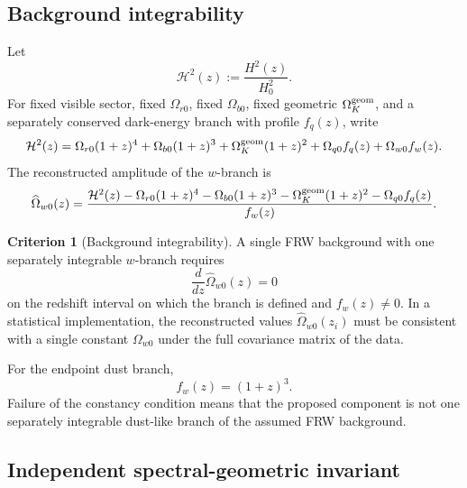 \documentclass[11pt,a4paper]{article}
\def\dd{d}%
\numberwithin{equation}{section}
\theoremstyle{definition}
\newtheorem{criterion}{Criterion}
\theoremstyle{plain}
\theoremstyle{remark}
\newcommand{\dd}{\mathrm{d}}
\begin{document}
\subsection{Background integrability}

Let
\begin{equation}
\mathcal H^2(z):=\frac{H^2(z)}{H_0^2}.
\end{equation}
For fixed visible sector, fixed \(\Omega_{r0}\), fixed \(\Omega_{b0}\), fixed geometric \(\Omega_K^{\rm geom}\), and a separately conserved dark-energy branch with profile \(f_q(z)\), write
\begin{equation}
\mathcal H^2(z)=
\Omega_{r0}(1+z)^4
+\Omega_{b0}(1+z)^3
+\Omega_K^{\rm geom}(1+z)^2
+\Omega_{q0}f_q(z)
+\Omega_{w0}f_w(z).
\end{equation}
The reconstructed amplitude of the \(w\)-branch is
\begin{equation}
\widehat{\Omega}_{w0}(z)
=
\frac{
\mathcal H^2(z)
-\Omega_{r0}(1+z)^4
-\Omega_{b0}(1+z)^3
-\Omega_K^{\rm geom}(1+z)^2
-\Omega_{q0}f_q(z)
}{
f_w(z)
}.
\end{equation}

\begin{criterion}[Background integrability]
A single FRW background with one separately integrable \(w\)-branch requires
\begin{equation}
\frac{\dd}{\dd z}\widehat{\Omega}_{w0}(z)=0
\end{equation}
on the redshift interval on which the branch is defined and \(f_w(z)\neq0\). In a statistical implementation, the reconstructed values \(\widehat{\Omega}_{w0}(z_i)\) must be consistent with a single constant \(\Omega_{w0}\) under the full covariance matrix of the data.
\end{criterion}

For the endpoint dust branch,
\begin{equation}
f_w(z)=(1+z)^3.
\end{equation}
Failure of the constancy condition means that the proposed component is not one separately integrable dust-like branch of the assumed FRW background.

\subsection{Independent spectral-geometric invariant}
\end{document}
